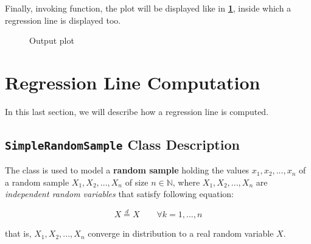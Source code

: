 \documentclass[sigconf]{acmart}
\begin{document}
Finally, invoking  function, the plot will be displayed like in \textbf{\cref{PlotExample}}, inside which a regression line is displayed too.

\begin{figure}[h]
    \caption{Output plot}%
    \label{PlotExample}%
\end{figure}

\section{Regression Line Computation}

In this last section, we will describe how a regression line is computed.

\subsection{\texttt{SimpleRandomSample} Class Description}

The  class is used to model a \textbf{random sample} holding the values $x_1,x_2,...,x_n$ of a random sample $X_1,X_2,...,X_n$ of size $n \in \mathbb{N}$, where $X_1,X_2,...,X_n$ are \textit{independent random variables} that satisfy following equation:

\begin{equation}
X \overset{\mathrm{\textit{d}}}{=} X\qquad \forall k = 1,...,n
\end{equation}

that is, $X_1,X_2,...,X_n$ converge in distribution to a real random variable $X$.
\end{document}
